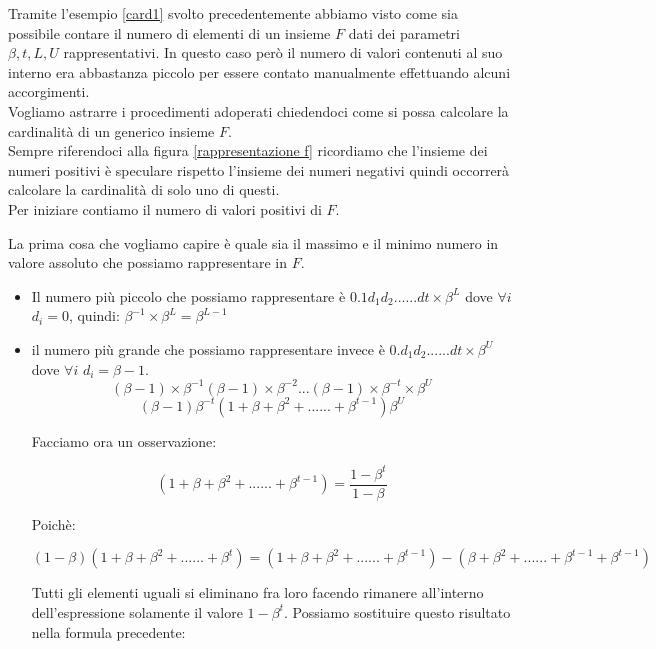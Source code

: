 \documentclass[12pt, a4paper]{book}
\theoremstyle{definition}
\begin{document}
\begin{flushleft}

Tramite l'esempio \ref{card1} svolto precedentemente abbiamo visto come sia possibile contare il numero di elementi di un insieme $F$ dati dei  parametri $\beta, t, L,U$ rappresentativi.  In questo caso però il numero di valori contenuti al suo interno era abbastanza piccolo per essere contato manualmente effettuando alcuni accorgimenti.\\
Vogliamo astrarre i procedimenti adoperati chiedendoci come si possa calcolare la cardinalità di un generico insieme $F$.\\
\vspace{1em}
Sempre riferendoci alla figura \ref{rappresentazione f} ricordiamo che l'insieme dei numeri positivi è speculare rispetto l'insieme dei numeri negativi quindi occorrerà calcolare la cardinalità di solo uno di questi.\\

Per iniziare contiamo il numero di valori positivi di $F$. 

La prima cosa che vogliamo capire è quale sia il massimo e il minimo numero in valore assoluto che possiamo rappresentare in $F$.  \\
\begin{itemize}
	\item Il numero più piccolo che possiamo rappresentare è $0.1d_{1}d_{2}......d{t} \times \beta^{L}$ dove $\forall i $ $d_{i} = 0$, quindi: $\beta^{-1}\times\beta^{L}=\beta^{L-1}$ 
	\item il numero più grande che possiamo rappresentare invece è $0.d_{1}d_{2}......d{t} \times \beta^{U}$ dove $\forall i $ $d_{i} = \beta - 1$. 
\[ (\beta -1)\times\beta^{-1}(\beta -1)\times\beta^{-2}...(\beta -1)\times\beta^{-t} \times \beta^{U} \]
\[ (\beta -1) \beta^{-t}(1 + \beta + \beta^{2} +......+ \beta^{t-1})\beta^{U} \]

Facciamo ora un osservazione:

\[ (1 + \beta + \beta^{2} +......+ \beta^{t-1})  = \frac{1-\beta^{t}}{1-\beta}\]

Poichè:

\[ (1-\beta)(1 + \beta + \beta^{2} +......+ \beta^{t}) = (1 + \beta + \beta^{2} +......+ \beta^{t-1}) - (\beta + \beta^{2} +......+ \beta^{t-1} + \beta^{t-1}) \]

Tutti gli elementi uguali si eliminano fra loro facendo rimanere all'interno dell'espressione solamente il valore $1-\beta^{t}$. Possiamo sostituire questo risultato nella formula precedente: 


\end{itemize}
\end{flushleft}
\end{document}
